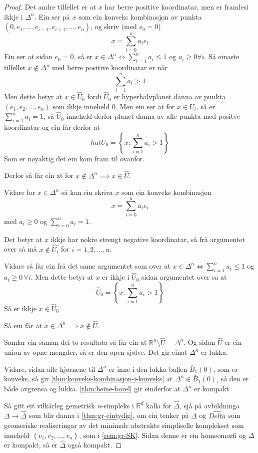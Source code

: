 \documentclass[a4paper, 12pt, norsk]{article}
\theoremstyle{plain}
\theoremstyle{definition}
\newcommand{\Rb}{\mathbb{R}}
\newcommand{\set}[1]{ \left\{ #1 \right\} } %
\newcommand{\tuple}[1]{ \left( #1 \right) } %
\begin{document}
\begin{proof}
	Det andre tilfellet er at \( x \) har berre positive koordinatar, men er framlesi ikkje i \( \Delta^n \). Ein ser på \( x \) som ein konveks kombinasjon av punkta \( \tuple{0, e_1, \dots, e_{i-1}, e_{i+1}, \dots, e_n} \), og skriv (med \( e_0 = 0 \))
	\[
		x = \sum_{i=0}^n a_i e_i
	\]
	Ein ser at sidan \( e_0 = 0 \), så er \( x \in \Delta^n \iff \sum_{i=1}^n a_i \leq 1 \) og \( a_i \geq 0 \forall i \). Så einaste tilfellet \( x \not\in \Delta^n \) med berre positive koordinatar er når
	\[
		\sum_{i=1}^n a_i > 1
	\]
	Men dette betyr at \( x \in \hat{U}_0 \) fordi \( \hat{U}_0 \) er hyperhalvplanet danna av punkta \( \tuple{e_1, e_2, \dots, e_n} \) som ikkje inneheld \( 0 \). Men ein ser at for \( x \in U_i \), så er \( \sum_{i=1}^n a_i = 1 \), så \( \hat{U}_0 \) inneheld derfor planet danna av alle punkta med positve koordinatar og ein får derfor at
	\[
		hat{U}_0 = \set{ x : \sum_{i=1}^n a_i > 1}
	\]
	Som er nøyaktig det ein kom fram til ovanfor.

	Derfor så får ein at for \( x \not\in \Delta^n \implies x \in \hat{U} \).

	Vidare for \( x \in \Delta^n \) så kan ein skriva \( x \) som ein konveks kombinasjon
	\[
		x = \sum_{i=0}^n a_i e_i
	\]
	med \( a_i \geq 0 \) og \( \sum_{i=0}^n a_i = 1 \).

	Det betyr at \( x \) ikkje har nokre strengt negative koordinatar, så frå argumentet over så må \( x \not\in \hat{U_i} \) for \( i = 1, 2, \dots, n \).

	Vidare så får ein frå det same argumentet som over at \( x \in \Delta^n \iff \sum_{i=1}^n a_i \leq 1 \) og \( a_i \geq 0 \, \forall i \). Men dette betyr at \( x \) er ikkje i \( \hat{U}_0 \) sidan argumentet over sa at
	\[
		\hat{U}_0 = \set{ x : \sum_{i=1}^n a_i > 1}
	\]
	Så er ikkje \( x \in \hat{U}_0 \)

	Så ein får at \( x \in \Delta^n \implies x \not\in \hat{U} \).

	Samlar ein saman dei to resultata så får ein at \( \Rb^n \setminus \hat{U} = \Delta^n \). Og sidan \( \hat{U} \) er ein union av opne mengder, så er den open sjølve. Det gir einat \( \Delta^n \) er lukka.

	Vidare, sidan alle hjørnene til \( \Delta^n \) er inne i den lukka ballen \( \bar{B}_{1}(0) \), som er konveks, så gir \autoref{thm:konveks-kombinasjon-i-konveks} at \( \Delta^n \in \bar{B}_{1}(0) \), så den er både avgrensa og lukka. \autoref{thm:heine-borel} gir einderfor at \( \Delta^n \) er kompakt.

	Så gitt eit vilkårleg gemetrisk \( n \)-simpleks i \( \Rb^d \) kalla for \( \hat{\Delta} \), sjå på avbildninga \( \Delta \to \hat{\Delta} \) som blir danna i \autoref{thm:gr-eintydig}, om ein tenker på \( \Delta \) og \( \hat{Delta} \) som geomeriske realiseringar av det minimale abstrakte simpliselle komplekset som inneheld \( \set{v_1, v_2, \dots, v_n} \), som i \autoref{rem:gr-SK}. Sidan denne er ein homeomorfi og \( \Delta \) er kompakt, så er \( \hat{\Delta} \) også kompakt.


\end{proof}
\end{document}
